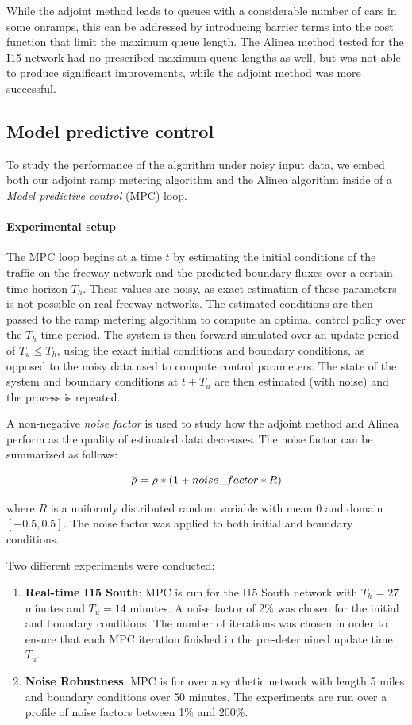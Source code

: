 While the adjoint method leads to queues with a considerable number of cars in some onramps, this can be addressed by introducing barrier terms into the cost function that limit the
maximum queue length. The Alinea method tested for the I15 network
had no prescribed maximum queue lengths as well, but was not able
to produce significant improvements, while the adjoint method was
more successful.


\subsection{Model predictive control\label{sub:Model-predictive-control}}

To study the performance of the algorithm under noisy input data,
we embed both our adjoint ramp metering algorithm and the Alinea algorithm
inside of a \emph{Model predictive control }(MPC) loop.


\paragraph{Experimental setup}

The MPC loop begins at a time $t$ by estimating the initial conditions
of the traffic on the freeway network and the predicted boundary fluxes
over a certain time horizon $T_{h}$. These values are noisy, as exact
estimation of these parameters is not possible on real freeway networks.
The estimated conditions are then passed to the ramp metering algorithm
to compute an optimal control policy over the $T_{h}$ time period.
The system is then forward simulated over an update period of $T_{u}\le T_{h}$,
using the exact initial conditions and boundary conditions, as opposed
to the noisy data used to compute control parameters. The state of
the system and boundary conditions at $t+T_{u}$ are then estimated
(with noise) and the process is repeated.

A non-negative\emph{ noise factor} is used to study how the adjoint
method and Alinea perform as the quality of estimated data decreases.
The noise factor can be summarized as follows:

\[
\bar{\rho_{}^{}}=\rho_{}^{}*(1+noise\_factor*R)
\]


where $R$ is a uniformly distributed random variable with mean $0$
and domain $\left[-0.5,0.5\right]$. The noise factor was applied
to both initial and boundary conditions.

Two different experiments were conducted:
\begin{enumerate}
\item \textbf{Real-time I15 South}: MPC is run for the I15 South network
with $T_{h}=27$ minutes and $T_{u}=14$ minutes. A noise factor of
2\% was chosen for the initial and boundary conditions. The number
of iterations was chosen in order to ensure that each MPC iteration
finished in the pre-determined update time $T_{u}$.
\item \textbf{Noise Robustness}: MPC is for over a synthetic network with
length 5 miles and boundary conditions over 50 minutes. The experiments
are run over a profile of noise factors between 1\% and 200\%.
\end{enumerate}

